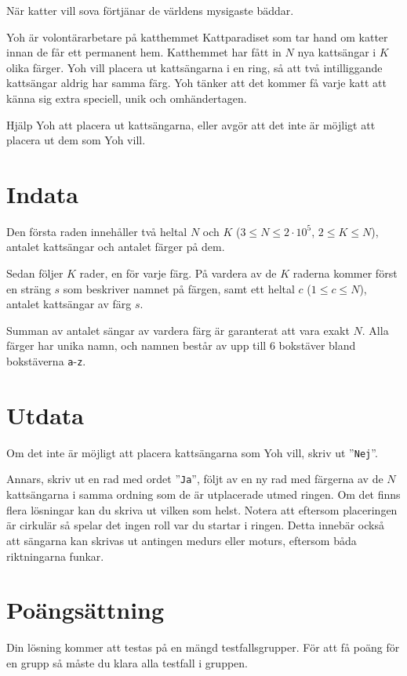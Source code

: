 
När katter vill sova förtjänar de världens mysigaste bäddar.

Yoh är volontärarbetare på katthemmet Kattparadiset som tar hand om katter innan de får ett permanent hem.
Katthemmet har fått in $N$ nya kattsängar i $K$ olika färger.
Yoh vill placera ut kattsängarna i en ring, så att två intilliggande kattsängar aldrig har samma färg.
Yoh tänker att det kommer få varje katt att känna sig extra speciell, unik och omhändertagen.

Hjälp Yoh att placera ut kattsängarna, eller avgör att det inte är möjligt att placera ut dem som Yoh vill.

\section*{Indata}
Den första raden innehåller två heltal $N$ och $K$ ($3 \le N \le 2 \cdot 10^5$, $2 \le K \le N$), antalet kattsängar och antalet färger på dem.

Sedan följer $K$ rader, en för varje färg. 
På vardera av de $K$ raderna kommer först en sträng $s$ som beskriver namnet på färgen, samt ett heltal $c$ ($1 \leq c \leq N$), antalet kattsängar av färg $s$.

Summan av antalet sängar av vardera färg är garanterat att vara exakt $N$.
Alla färger har unika namn, och namnen består av upp till 6 bokstäver bland bokstäverna \texttt{a}-\texttt{z}.

\section*{Utdata}
Om det inte är möjligt att placera kattsängarna som Yoh vill, skriv ut ''\texttt{Nej}''.

Annars, skriv ut en rad med ordet ''\texttt{Ja}'', följt av en ny rad med färgerna av de $N$ kattsängarna i samma ordning som de är utplacerade utmed ringen.
Om det finns flera lösningar kan du skriva ut vilken som helst.
Notera att eftersom placeringen är cirkulär så spelar det ingen roll var du startar i ringen.
Detta innebär också att sängarna kan skrivas ut antingen medurs eller moturs, eftersom båda riktningarna funkar.

\section*{Poängsättning}
Din lösning kommer att testas på en mängd testfallsgrupper.
För att få poäng för en grupp så måste du klara alla testfall i gruppen.

